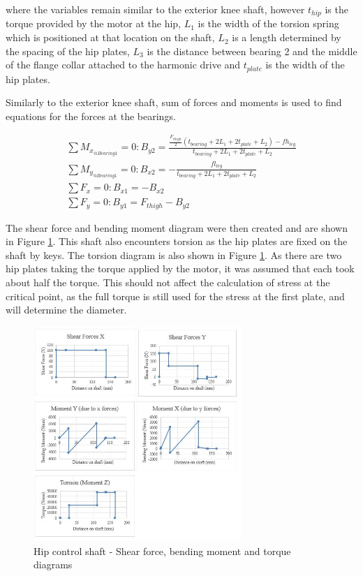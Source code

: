 where the variables remain similar to the exterior knee shaft, however $t_{hip}$ is the torque provided by the motor at the hip, $L_1$ is the width of the torsion spring which is positioned at that location on the shaft, $L_2$ is a length determined by the spacing of the hip plates, $L_3$ is the distance between bearing 2 and the middle of the flange collar attached to the harmonic drive and $t_{plate}$ is the width of the hip plates.

Similarly to the exterior knee shaft, sum of forces and moments is used to find equations for the forces at the bearings. 

\begin{gather}
    \sum M_{x_{@Bearing 1}}=0:  B_{y2}=\frac{\frac{F_{thigh}}{2}(t_{bearing}+2L_1+2t_{plate}+L_2)-fh_{leg}}{t_{bearing}+2L_1+2t_{plate}+L_2} \label{eq:hip_bearing1}
    \\
    \sum M_{y_{@Bearing 1}}=0:  B_{x2}=-\frac{fl_{leg}}{t_{bearing}+2L_1+2t_{plate}+L_2}
    \\
    \sum F_x=0: B_{x1}=-B_{x2}
    \\
    \sum F_y=0: B_{y1}=F_{thigh}-B_{y2} \label{eq:hip_bearing2}
\end{gather}

The shear force and bending moment diagram were then created and are shown in Figure \ref{fig:shaft_hip_diagrams}. This shaft also encounters torsion as the hip plates are fixed on the shaft by keys. The torsion diagram is also shown in Figure \ref{fig:shaft_hip_diagrams}. As there are two hip plates taking the torque applied by the motor, it was assumed that each took about half the torque. This should not affect the calculation of stress at the critical point, as the full torque is still used for the stress at the first plate, and will determine the diameter.

\begin{figure}
    \centering
    \includegraphics[width=0.7\textwidth]{4_Analysis/img/Shafts/ShaftHipDiagrams.JPG}
    \caption{Hip control shaft - Shear force, bending moment and torque diagrams}
    \label{fig:shaft_hip_diagrams}
\end{figure}

